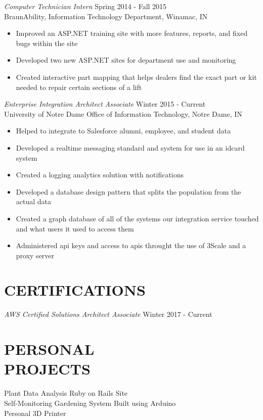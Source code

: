 \documentclass[margin]{res}
\begin{document}
\begin{resume}
{\sl Computer Technician Intern} \hfill Spring 2014 - Fall 2015 \\
                BraunAbility, 
                Information Technology Department, Winamac, IN 
                 \begin{itemize}  \itemsep -2pt %
                 \item Improved an ASP.NET training site with more features, reports, and fixed bugs within the site
                \item   Developed two new ASP.NET sites for department use and monitoring
                \item
                Created interactive part mapping that helps dealers find the exact part or kit needed to repair certain sections of a lift
                \end{itemize}

{\sl Enterprise Integration Architect Associate} \hfill Winter 2015 - Current \\
                University of Notre Dame
                Office of Information Technology, Notre Dame, IN
                \begin{itemize} \itemsep -2pt
                  \item Helped to integrate to Salesforce alumni, employee, and student data
                  \item Developed a realtime messaging standard and system for use in an idcard system
                  \item Created a logging analytics solution with notifications
                  \item Developed a database design pattern that splits the population from the actual data
                  \item Created a graph database of all of the systems our integration service touched and what users it used to access them
                  \item Administered api keys and access to apis throught the use of 3Scale and a proxy server
                \end{itemize}

\section{CERTIFICATIONS}
{\sl AWS Certified Solutions Architect Associate} \hfill Winter 2017 - Current \\

\section{PERSONAL \\ PROJECTS}
            Plant Data Analysis Ruby on Rails Site\\
            Self-Monitoring Gardening System Built using Arduino\\
            Personal 3D Printer\\
\end{resume}
\end{document}
